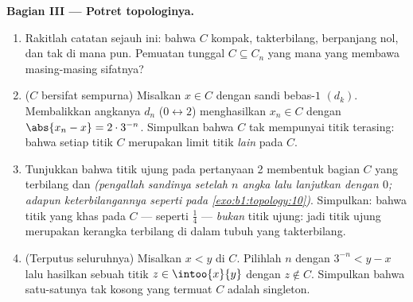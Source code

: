 \begin{problem}[{Soal akhir pekan --- \omterm{pb:b1:topology:1}{himpunan Cantor} sepertiga
tengah: panjang nol, takterbilang, sempurna, dan $C + C =
\intcc{0}{2}$}]
\medskip
\noindent\textbf{Bagian III --- Potret topologinya.}
\begin{enumerate}[resume]
  \item Rakitlah catatan sejauh ini: bahwa $C$ kompak, takterbilang,
        berpanjang nol, dan tak  di mana pun. Pemuatan tunggal
        $C \subseteq C_n$ yang mana yang membawa masing-masing sifatnya?
  \item ($C$ bersifat sempurna) Misalkan $x \in C$ dengan sandi bebas-$1$
        $(d_k)$. Membalikkan angkanya $d_n$ ($0 \leftrightarrow
        2$) menghasilkan $x_n \in C$ dengan $\abs{x_n - x} = 2 \cdot
        3^{-n}$. Simpulkan bahwa $C$ tak mempunyai titik terasing: bahwa setiap
        titik $C$ merupakan limit titik \emph{lain} pada $C$.
  \item Tunjukkan bahwa titik ujung pada pertanyaan 2 membentuk  bagian
        $C$ yang terbilang dan  \emph{(pengallah sandinya setelah $n$
        angka lalu lanjutkan dengan $0$; adapun keterbilangannya seperti pada
        \cref{exo:b1:topology:10})}. Simpulkan: bahwa titik yang khas
        pada $C$ --- seperti $\frac14$ --- \emph{bukan} titik ujung:
        jadi titik ujung merupakan kerangka terbilang di dalam tubuh yang
        takterbilang.
  \item (Terputus seluruhnya) Misalkan $x < y$ di $C$. Pilihlah $n$
        dengan $3^{-n} < y - x$ lalu hasilkan sebuah titik $z \in
        \intoo{x}{y}$ dengan $z \notin C$. Simpulkan bahwa satu-satunya
         tak kosong yang termuat $C$ adalah singleton.
\end{enumerate}


\end{problem}
